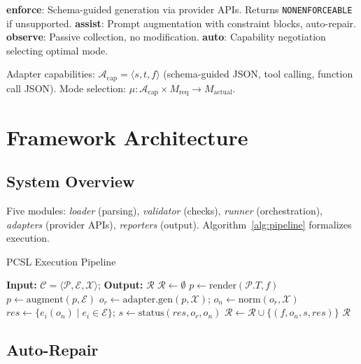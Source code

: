 \documentclass[sigconf]{acmart}
\begin{document}
\textbf{enforce}: Schema-guided generation via provider APIs. Returns \texttt{NONENFORCEABLE} if unsupported.
\textbf{assist}: Prompt augmentation with constraint blocks, auto-repair.
\textbf{observe}: Passive collection, no modification.
\textbf{auto}: Capability negotiation selecting optimal mode.

Adapter capabilities: \( \mathcal{A}_{\text{cap}} = \langle s, t, f \rangle \) (schema-guided JSON, tool calling, function call JSON). Mode selection: \( \mu: \mathcal{A}_{\text{cap}} \times M_{\text{req}} \to M_{\text{actual}} \).

\section{Framework Architecture}

\subsection{System Overview}

Five modules: \textit{loader} (parsing), \textit{validator} (checks), \textit{runner} (orchestration), \textit{adapters} (provider APIs), \textit{reporters} (output). Algorithm~\ref{alg:pipeline} formalizes execution.

\begin{algorithm}[H]
\caption{PCSL Execution Pipeline}
\label{alg:pipeline}
\scriptsize
\begin{algorithmic}[1]
\STATE \textbf{Input:} \( \mathcal{C} = \langle \mathcal{P}, \mathcal{E}, \mathcal{X} \rangle \); \textbf{Output:} \( \mathcal{R} \)
\STATE \( \mathcal{R} \leftarrow \emptyset \)
  \STATE \( p \leftarrow \text{render}(\mathcal{P}.T, f) \)
   \STATE \( p \leftarrow \text{augment}(p, \mathcal{E}) \) \ENDIF
  \STATE \( o_r \leftarrow \text{adapter.gen}(p, \mathcal{X}) \); \( o_n \leftarrow \text{norm}(o_r, \mathcal{X}) \)
  \STATE \( res \leftarrow \{e_i(o_n) \mid e_i \in \mathcal{E}\} \); \( s \leftarrow \text{status}(res, o_r, o_n) \)
  \STATE \( \mathcal{R} \leftarrow \mathcal{R} \cup \{(f, o_n, s, res)\} \)
\ENDFOR
\RETURN \( \mathcal{R} \)
\end{algorithmic}
\end{algorithm}

\subsection{Auto-Repair}
\end{document}
